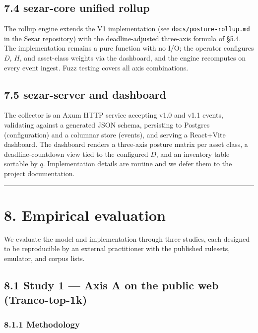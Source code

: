 \subsection{7.4 sezar-core unified
rollup}\label{sezar-core-unified-rollup}

The rollup engine extends the V1 implementation (see
\texttt{docs/posture-rollup.md} in the Sezar repository) with the
deadline-adjusted three-axis formula of §5.4. The implementation remains
a pure function with no I/O; the operator configures \(D\), \(H\), and
asset-class weights via the dashboard, and the engine recomputes on
every event ingest. Fuzz testing covers all axis combinations.

\subsection{7.5 sezar-server and
dashboard}\label{sezar-server-and-dashboard}

The collector is an Axum HTTP service accepting v1.0 and v1.1 events,
validating against a generated JSON schema, persisting to Postgres
(configuration) and a columnar store (events), and serving a React+Vite
dashboard. The dashboard renders a three-axis posture matrix per asset
class, a deadline-countdown view tied to the configured \(D\), and an
inventory table sortable by \(q\). Implementation details are routine
and we defer them to the project documentation.

\begin{center}\rule{0.5\linewidth}{0.5pt}\end{center}

\section{8. Empirical evaluation}\label{empirical-evaluation}

We evaluate the model and implementation through three studies, each
designed to be reproducible by an external practitioner with the
published rulesets, emulator, and corpus lists.

\subsection{8.1 Study 1 --- Axis A on the public web
(Tranco-top-1k)}\label{study-1-axis-a-on-the-public-web-tranco-top-1k}

\subsubsection{8.1.1 Methodology}\label{methodology}


